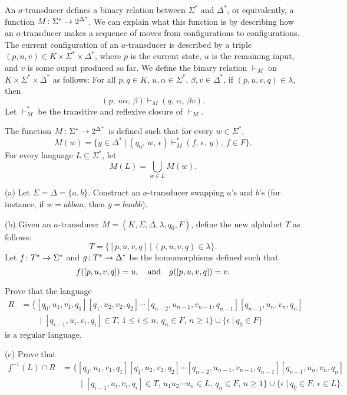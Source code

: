 \documentclass[12pt]{article}
\begin{document}
\medskip
An $a$-transducer defines a binary relation between
$\Sigma^*$ and $\Delta^*$, or equivalently, a function
$M\colon \Sigma^*\rightarrow 2^{\Delta^{*}}$.
We can explain what this function is by describing
how an $a$-transducer makes a sequence of moves from
configurations to configurations.
The current configuration of an $a$-transducer 
is described by
a triple $(p, u, v)\in K\times \Sigma^*\times \Delta^*$,
where $p$ is the current state, $u$ is the remaining
input, and $v$ is some ouput produced so far.
We define the binary relation $\vdash_M$ on
$K\times \Sigma^*\times \Delta^*$ as follows:
For all $p, q\in K$, $u, \alpha\in\Sigma^*$,
$\beta, v\in \Delta^*$, if
$(p, u, v, q)\in \lambda$, then
$$(p,\, u\alpha,\, \beta) \vdash_M (q,\, \alpha,\, \beta v).$$
Let $\vdash_M^*$ be the transitive and reflexive closure
of $\vdash_M$. 

\medskip
The function
$M\colon \Sigma^*\rightarrow 2^{\Delta^{*}}$ is defined such that
for every $w\in \Sigma^*$,
$$M(w) = \{y\in \Delta^*\ |\ (q_0,\, w,\, \epsilon)
\vdash_M^* (f,\, \epsilon,\, y),\ f\in F\}.$$
For every language $L \subseteq \Sigma^*$, let
$$M(L) = \bigcup_{w\in L} M(w).$$

\medskip
(a)
Let $\Sigma = \Delta = \{a, b\}$.
Construct an $a$-transducer swapping $a$'s and $b$'s
(for instance, if $w = abbaa$, then $y = baabb$).

\medskip
(b)
Given an $a$-transducer 
$M = (K, \Sigma, \Delta, \lambda, q_0, F)$,
define the new alphabet $T$ as follows:
$$T = \{[p, u, v, q]\ |\ (p, u, v, q)\in \lambda\}.$$
Let $f\colon T^*\rightarrow \Sigma^*$ and
$g\colon T^*\rightarrow \Delta^*$  be the homomorphisms defined
such that
$$f([p, u, v, q]) = u,\quad\hbox{and}\quad
g([p, u, v, q]) = v.$$

\medskip
Prove that the language
\begin{align*}
R & = \{[q_0, u_1, v_1, q_1][q_1, u_2, v_2, q_2]\cdots 
[q_{n-2}, u_{n-1}, v_{n-1}, q_{n-1}][q_{n-1}, u_n, v_n, q_n]\\
& \qquad \mid  [q_{i-1}, u_i, v_i, q_i]\in T,\, 1\leq i\leq n,\,
q_n\in F,\, n\geq 1\}\cup \{\epsilon\ |\ q_0\in F\}\
\end{align*}
is a regular language.

\medskip
(c) Prove that
\begin{align*}
f^{-1}(L)\cap R & = 
\{[q_0, u_1, v_1, q_1][q_1, u_2, v_2, q_2]\cdots 
[q_{n-2}, u_{n-1}, v_{n-1}, q_{n-1}][q_{n-1}, u_n, v_n, q_n]\\
& \qquad \mid  [q_{i-1}, u_i, v_i, q_i]\in T,\, u_1u_2\cdots u_n\in L,\,
q_n\in F,\, n\geq 1\}\cup \{\epsilon\ |\ q_0\in F,\, \epsilon\in L\}.
\end{align*}
\end{document}
